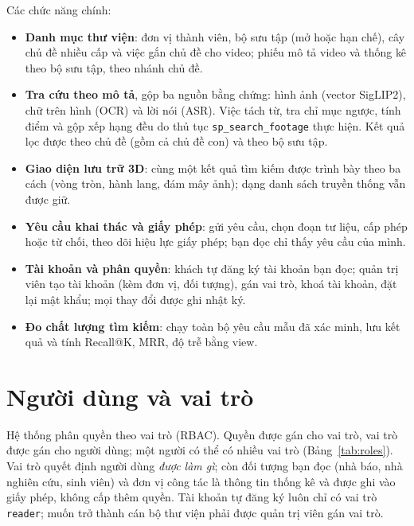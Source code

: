 Các chức năng chính:
\begin{itemize}
    \item \textbf{Danh mục thư viện}: đơn vị thành viên, bộ sưu tập (mở hoặc hạn chế), cây chủ
    đề nhiều cấp và việc gắn chủ đề cho video; phiếu mô tả video và thống kê theo bộ sưu tập,
    theo nhánh chủ đề.
    \item \textbf{Tra cứu theo mô tả}, gộp ba nguồn bằng chứng: hình ảnh (vector SigLIP2),
    chữ trên hình (OCR) và lời nói (ASR). Việc tách từ, tra chỉ mục ngược, tính điểm và gộp
    xếp hạng đều do thủ tục \texttt{sp\_search\_footage} thực hiện. Kết quả lọc được theo chủ
    đề (gồm cả chủ đề con) và theo bộ sưu tập.
    \item \textbf{Giao diện lưu trữ 3D}: cùng một kết quả tìm kiếm được trình bày theo ba
    cách (vòng tròn, hành lang, đám mây ảnh); dạng danh sách truyền thống vẫn được giữ.
    \item \textbf{Yêu cầu khai thác và giấy phép}: gửi yêu cầu, chọn đoạn tư liệu, cấp phép
    hoặc từ chối, theo dõi hiệu lực giấy phép; bạn đọc chỉ thấy yêu cầu của mình.
    \item \textbf{Tài khoản và phân quyền}: khách tự đăng ký tài khoản bạn đọc; quản trị viên
    tạo tài khoản (kèm đơn vị, đối tượng), gán vai trò, khoá tài khoản, đặt lại mật khẩu; mọi
    thay đổi được ghi nhật ký.
    \item \textbf{Đo chất lượng tìm kiếm}: chạy toàn bộ yêu cầu mẫu đã xác minh, lưu kết quả
    và tính Recall@K, MRR, độ trễ bằng view.
\end{itemize}

\section{Người dùng và vai trò}

Hệ thống phân quyền theo vai trò (RBAC). Quyền được gán cho vai trò, vai trò được gán cho
người dùng; một người có thể có nhiều vai trò (Bảng~\ref{tab:roles}). Vai trò quyết định
người dùng \textit{được làm gì}; còn đối tượng bạn đọc (nhà báo, nhà nghiên cứu, sinh viên)
và đơn vị công tác là thông tin thống kê và được ghi vào giấy phép, không cấp thêm quyền.
Tài khoản tự đăng ký luôn chỉ có vai trò \texttt{reader}; muốn trở thành cán bộ thư viện phải
được quản trị viên gán vai trò.

